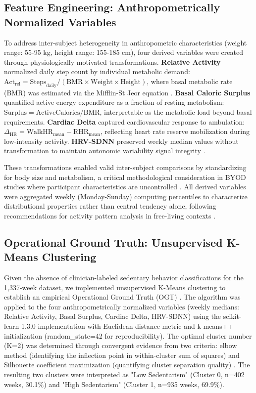\documentclass[journal,twoside,web]{ieeecolor}
\begin{document}
\subsection{Feature Engineering: Anthropometrically Normalized Variables}
\label{subsec:features}

To address inter-subject heterogeneity in anthropometric characteristics (weight range: 55-95 kg, height range: 155-185 cm), four derived variables were created through physiologically motivated transformations. \textbf{Relative Activity} normalized daily step count by individual metabolic demand: $\text{Act}_{\text{rel}} = \text{Steps}_{\text{daily}} / (\text{BMR} \times \text{Weight} \times \text{Height})$, where basal metabolic rate (BMR) was estimated via the Mifflin-St Jeor equation \cite{Mifflin1990}. \textbf{Basal Caloric Surplus} quantified active energy expenditure as a fraction of resting metabolism: $\text{Surplus} = \text{ActiveCalories} / \text{BMR}$, interpretable as the metabolic load beyond basal requirements. \textbf{Cardiac Delta} captured cardiovascular response to ambulation: $\Delta_{\text{HR}} = \text{WalkHR}_{\text{mean}} - \text{RHR}_{\text{mean}}$, reflecting heart rate reserve mobilization during low-intensity activity. \textbf{HRV-SDNN} preserved weekly median values without transformation to maintain autonomic variability signal integrity \cite{Shaffer2017}.

These transformations enabled valid inter-subject comparisons by standardizing for body size and metabolism, a critical methodological consideration in BYOD studies where participant characteristics are uncontrolled \cite{Guyon2003}. All derived variables were aggregated weekly (Monday-Sunday) computing percentiles to characterize distributional properties rather than central tendency alone, following recommendations for activity pattern analysis in free-living contexts \cite{Dumuid2018}.

\subsection{Operational Ground Truth: Unsupervised K-Means Clustering}
\label{subsec:clustering}

Given the absence of clinician-labeled sedentary behavior classifications for the 1,337-week dataset, we implemented unsupervised K-Means clustering to establish an empirical Operational Ground Truth (OGT) \cite{Jain2010}. The algorithm was applied to the four anthropometrically normalized variables (weekly medians: Relative Activity, Basal Surplus, Cardiac Delta, HRV-SDNN) using the scikit-learn 1.3.0 implementation with Euclidean distance metric and k-means++ initialization (random\_state=42 for reproducibility). The optimal cluster number (K=2) was determined through convergent evidence from two criteria: elbow method (identifying the inflection point in within-cluster sum of squares) and Silhouette coefficient maximization (quantifying cluster separation quality) \cite{Rousseeuw1987}. The resulting two clusters were interpreted as "Low Sedentarism" (Cluster 0, n=402 weeks, 30.1\%) and "High Sedentarism" (Cluster 1, n=935 weeks, 69.9\%).
\end{document}
